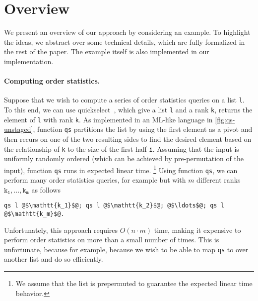 
\section{Overview}
\label{sec:examplea}

We present an overview of our approach by considering an example.  To
highlight the ideas, we abstract over some technical details, which
are fully formalized in the rest of the paper.  The example itself is
also implemented in our implementation.

\paragraph{Computing order statistics.}

\begin{abstrsyn}



Suppose that we wish to compute a series of order statistics queries
on a list \texttt{l}. To this end, we can use
quickselect~\cite{Hoare:1961}, which give a list \texttt{l} and a rank
\texttt{k}, returns the element of \texttt{l} with rank \texttt{k}.
As implemented in an ML-like language in \ref{fig:qs-unstaged},
function \texttt{qs} partitions the list by using the first element as
a pivot and then recurs on one of the two resulting sides to find the
desired element based on the relationship of \texttt{k} to the size of
the first half \texttt{i}.  Assuming that the input is uniformly
randomly ordered (which can be achieved by pre-permutation of the
input), function \texttt{qs} runs in expected linear time.
%
\footnote{We assume that the list is prepermuted to guarantee the
  expected linear time behavior.} 
%
Using function \texttt{qs}, we can perform many order statistics
queries, for example but with $m$ different ranks
$\mathtt{k_1},\dots,\mathtt{k_m}$ as follows
%
\begin{lstlisting}
qs l @$\mathtt{k_1}$@; qs l @$\mathtt{k_2}$@; @$\ldots$@; qs l @$\mathtt{k_m}$@.
\end{lstlisting}
%
Unfortunately, this approach requires $O(n \cdot m)$ time, making it
expensive to perform order statistics on more than a small number of
times. This is unfortunate, because for example, because we wish to be
able to map \texttt{qs} to over another list and do so
efficiently. 


\end{abstrsyn}
